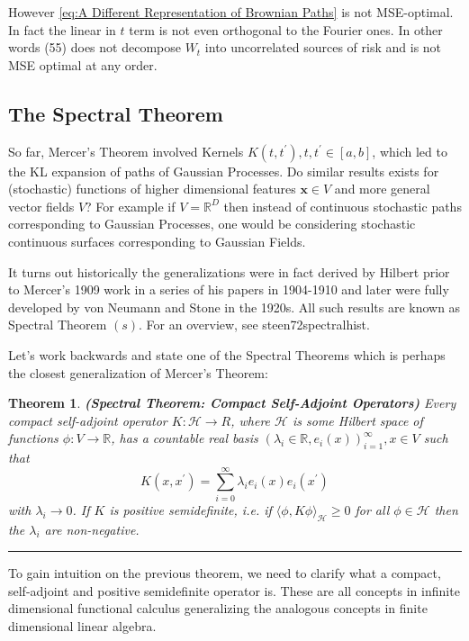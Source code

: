 \documentclass[11pt]{article}
\theoremstyle{plain} %
\newtheorem{theorem}{Theorem}[section]
\theoremstyle{remark}
\begin{document}
However \cref{eq:A Different Representation of Brownian Paths} is not MSE-optimal. In fact the linear in $t$ term is not even
orthogonal to the Fourier ones. In other words (55) does not decompose $W_{t}$
into uncorrelated sources of risk and is not MSE optimal at any order.

\subsection{The Spectral Theorem}
So far, Mercer's Theorem involved Kernels $K\left(t, t^{\prime}\right), t,
  t^{\prime} \in[a, b]$, which led to the KL expansion of paths of Gaussian
Processes. Do similar results exists for (stochastic) functions of higher
dimensional features $\mathbf{x} \in V$ and more general vector fields $V$? For
example if $V=\mathbb{R}^{D}$ then instead of continuous stochastic paths
corresponding to Gaussian Processes, one would be considering stochastic
continuous surfaces corresponding to Gaussian Fields.

It turns out historically the generalizations were in fact derived by Hilbert
prior to Mercer's 1909 work in a series of his papers in 1904-1910 and later
were fully developed by von Neumann and Stone in the 1920s. All such results are
known as Spectral Theorem $(s)$. For an overview, see steen72spectralhist.

Let's work backwards and state one of the Spectral Theorems which is perhaps the
closest generalization of Mercer's Theorem:

\begin{theorem}\textbf{(Spectral Theorem: Compact Self-Adjoint Operators)}
  Every compact self-adjoint operator $K: \mathcal{H} \rightarrow R$, where
$\mathcal{H}$ is some Hilbert space of functions $\phi: V \rightarrow
  \mathbb{R}$, has a countable real basis $\left(\lambda_{i} \in \mathbb{R},
  e_{i}(x)\right)_{i=1}^{\infty}, x \in V$ such that
$$
  K\left(x, x^{\prime}\right)=\sum_{i=0}^{\infty} \lambda_{i} e_{i}(x) e_{i}\left(x^{\prime}\right)
$$
with $\lambda_{i} \rightarrow 0$. If $K$ is positive semidefinite, i.e. if
$\langle\phi, K \phi\rangle_{\mathcal{H}} \geq 0$ for all $\phi \in \mathcal{H}$
then the $\lambda_{i}$ are non-negative.
\end{theorem}
\vspace*{0.4em}
\hrule

To gain intuition on the previous theorem, we need to clarify what a compact,
self-adjoint and positive semidefinite operator is. These are all concepts in
infinite dimensional functional calculus generalizing the analogous concepts in
finite dimensional linear algebra.
\end{document}
